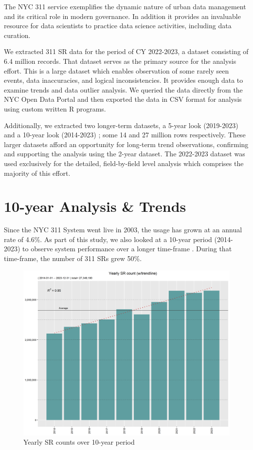 \documentclass[12pt, titlepage]{article}
\begin{document}
The NYC 311 service exemplifies the dynamic nature of urban data
management and its critical role in modern governance. In addition it provides an
invaluable resource for data scientists to practice data science activities, including data curation.

We extracted 311 SR data for the period of CY 2022-2023, a dataset consisting of
6.4 million records. That dataset serves as the primary source for the analysis effort. This is a large dataset which enables 
observation of some rarely seen events, data inaccuracies, and logical inconsistencies. It provides enough data to examine trends and data outlier analysis. 
We queried the data directly from the NYC Open Data Portal and then exported the data in CSV format for analysis using custom written R programs.

Additionally, we extracted two longer-term datasets, a 5-year look (2019-2023) and a 10-year look (2014-2023) ; some 14 and 27 million rows respectively. 
These larger datasets afford an opportunity for long-term trend observations, confirming and supporting the analysis using the 2-year dataset. The 2022-2023 dataset
was used exclusively for the detailed, field-by-field level analysis which comprises the majority of this effort. 



\section{10-year Analysis \& Trends} \label{sec:trends}

Since the NYC 311 System went live in 2003, the usage has grown at an annual
rate of 4.6\%. As part of this study, we also looked at a 10-year period (2014-2023) to
observe system performance over a longer time-frame . During that time-frame, 
the number of 311 SRs grew 50\%.

\begin{figure}[H]
  \centering
  \includegraphics[width=\textwidth]{Yearly.png}
  \caption{Yearly SR counts over 10-year period}
  \label{fig:yearly-counts}
\end{figure}
\end{document}
